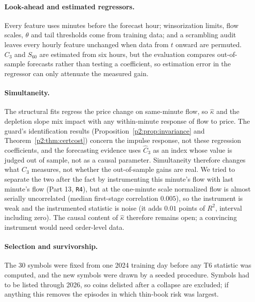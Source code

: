 \paragraph{Look-ahead and estimated regressors.} Every feature uses minutes before the forecast hour; winsorization limits, flow scales, $\theta$ and tail thresholds come from training data; and a scrambling audit leaves every hourly feature unchanged when data from $t$ onward are permuted. $\hat C_3$ and $S_{60}$ are estimated from six hours, but the evaluation compares out-of-sample forecasts rather than testing a coefficient, so estimation error in the regressor can only attenuate the measured gain.

\paragraph{Simultaneity.} The structural fits regress the price change on same-minute flow, so $\hat\kappa$ and the depletion slope mix impact with any within-minute response of flow to price. The guard's identification results (Proposition~\ref{p2:prop:invariance} and Theorem~\ref{p2:thm:certcost}) concern the impulse response, not these regression coefficients, and the forecasting evidence uses $\hat C_3$ as an index whose value is judged out of sample, not as a causal parameter. Simultaneity therefore changes what $\hat C_3$ measures, not whether the out-of-sample gains are real. We tried to separate the two after the fact by instrumenting this minute's flow with last minute's flow (Part 13, \texttt{R4}), but at the one-minute scale normalized flow is almost serially uncorrelated (median first-stage correlation $0.005$), so the instrument is weak and the instrumented statistic is noise (it adds $0.01$ points of $R^2$, interval including zero). The causal content of $\hat\kappa$ therefore remains open; a convincing instrument would need order-level data.

\paragraph{Selection and survivorship.} The 30 symbols were fixed from one 2024 training day before any T6 statistic was computed, and the new symbols were drawn by a seeded procedure. Symbols had to be listed through 2026, so coins delisted after a collapse are excluded; if anything this removes the episodes in which thin-book risk was largest.

